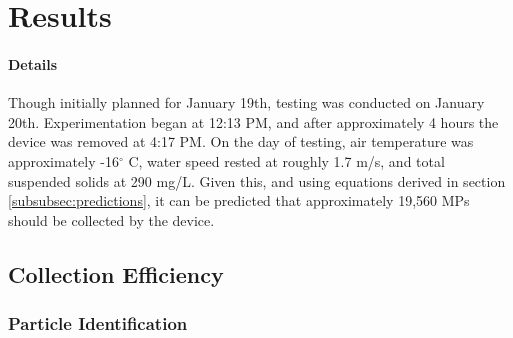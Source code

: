 \documentclass[fleqn,10pt]{SelfArx} %
\begin{document}
	\section{Results}
	\paragraph*{Details}
	Though initially planned for January 19th, testing was conducted on January 20th. Experimentation began at 12:13 PM, and after approximately 4 hours the device was removed at 4:17 PM. On the day of testing, air temperature was approximately -16$^{\circ}$ C, water speed rested at roughly 1.7 m/s, and total suspended solids at 290 mg/L. Given this, and using equations derived in section \ref{subsubsec:predictions}, it can be predicted that approximately 19,560 MPs should be collected by the device. 
	
	
	
	
	\subsection{Collection Efficiency}
	\subsubsection{Particle Identification}
	
\end{document}
